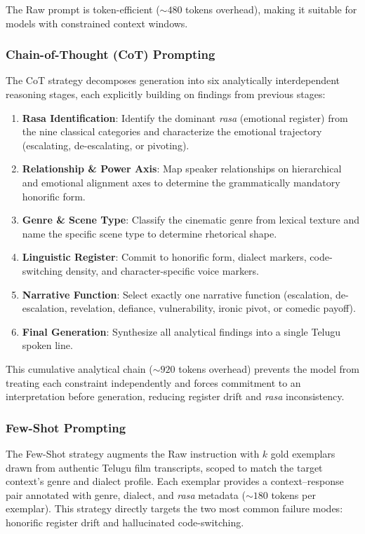 \documentclass[11pt]{article}
\begin{document}
The Raw prompt is token-efficient (${\sim}480$ tokens overhead), making it suitable for models with constrained context windows.

\subsubsection{Chain-of-Thought (CoT) Prompting}
\label{subsubsec:cot}

The CoT strategy decomposes generation into six analytically interdependent reasoning stages, each explicitly building on findings from previous stages:

\begin{enumerate}[leftmargin=*,itemsep=1pt]
    \item \textbf{Rasa Identification}: Identify the dominant \textit{rasa} (emotional register) from the nine classical categories and characterize the emotional trajectory (escalating, de-escalating, or pivoting).
    \item \textbf{Relationship \& Power Axis}: Map speaker relationships on hierarchical and emotional alignment axes to determine the grammatically mandatory honorific form.
    \item \textbf{Genre \& Scene Type}: Classify the cinematic genre from lexical texture and name the specific scene type to determine rhetorical shape.
    \item \textbf{Linguistic Register}: Commit to honorific form, dialect markers, code-switching density, and character-specific voice markers.
    \item \textbf{Narrative Function}: Select exactly one narrative function (escalation, de-escalation, revelation, defiance, vulnerability, ironic pivot, or comedic payoff).
    \item \textbf{Final Generation}: Synthesize all analytical findings into a single Telugu spoken line.
\end{enumerate}

This cumulative analytical chain (${\sim}920$ tokens overhead) prevents the model from treating each constraint independently and forces commitment to an interpretation before generation, reducing register drift and \textit{rasa} inconsistency.

\subsubsection{Few-Shot Prompting}
\label{subsubsec:fewshot}

The Few-Shot strategy augments the Raw instruction with $k$ gold exemplars drawn from authentic Telugu film transcripts, scoped to match the target context's genre and dialect profile. Each exemplar provides a context--response pair annotated with genre, dialect, and \textit{rasa} metadata (${\sim}180$ tokens per exemplar). This strategy directly targets the two most common failure modes: honorific register drift and hallucinated code-switching.
\end{document}

